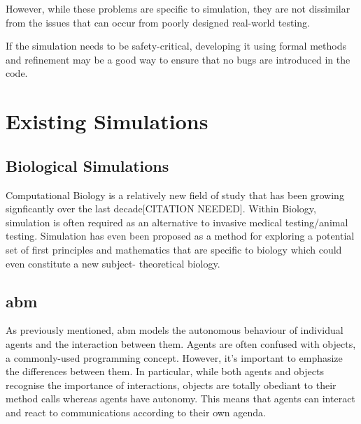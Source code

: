 \documentclass{UoYCSproject}
\begin{document}
However, while these problems are specific to simulation, they are not dissimilar from the issues that can occur from poorly designed real-world testing.

If the simulation needs to be safety-critical, developing it using formal methods and refinement may be a good way to ensure that no bugs are introduced in the code.

\section{Existing Simulations}

\subsection{Biological Simulations}
Computational Biology is a relatively new field of study that has been growing signficantly over the last decade[CITATION NEEDED].
Within Biology, simulation is often required as an alternative to invasive medical testing/animal testing.%
Simulation has even been proposed as a method for exploring a potential set of first principles and mathematics that are specific to biology which could even constitute a new subject- theoretical biology\cite{rise_article}.

\subsection{\acrlong{abm}}
\label{abm}
As previously mentioned, \gls{abm} models the autonomous behaviour of individual agents and the interaction between them.
Agents are often confused with objects, a commonly-used programming concept.
However, it's important to emphasize the differences between them.
In particular, while both agents and objects recognise the importance of interactions, objects are totally obediant to their method calls whereas agents have autonomy.
This means that agents can interact and react to communications according to their own agenda.
\end{document}

